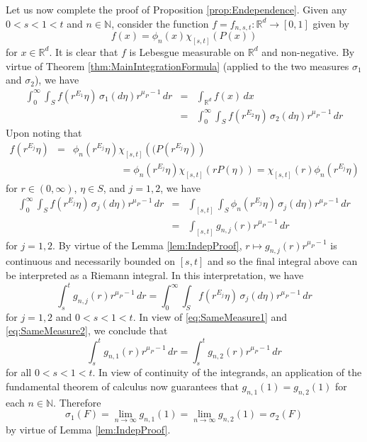 \documentclass[smallextended]{svjour3}
\theoremstyle{remark}
\renewenvironment{proof}[1][\proofname]{\renewcommand\xproofname{#1}\xproof}{\endxproof}
\begin{document}
\begin{proof}
\noindent Let us now complete the proof of Proposition \ref{prop:Endependence}. Given any $0<s<1< t$ and $n\in\mathbb{N}$, consider the function $f=f_{n,s,t}:\mathbb{R}^d\to [0,1]$ given by
\begin{equation*}
f(x)=\phi_n(x)\chi_{[s,t]}(P(x))
\end{equation*}
for $x\in\mathbb{R}^d$. It is clear that $f$ is Lebesgue measurable on $\mathbb{R}^d$ and non-negative. By virtue of Theorem \ref{thm:MainIntegrationFormula} (applied to the two measures $\sigma_1$ and $\sigma_2$), we have
\begin{eqnarray}\label{eq:SameMeasure1}
\int_0^\infty \int_Sf(r^{E_1}\eta)\,\sigma_1(d\eta)r^{\mu_P-1}\,dr
&=&\int_{\mathbb{R}^d}f(x)\,dx\nonumber\\
&=&\int_0^\infty \int_Sf(r^{E_2}\eta)\,\sigma_2(d\eta)r^{\mu_P-1}\,dr
\end{eqnarray}
Upon noting that
\begin{eqnarray*}
f(r^{E_j}\eta)&=&\phi_n(r^{E_j}\eta)\chi_{[s,t]}\left((P(r^{E_j}\eta)\right)\\
&& \hspace{2cm} =\phi_n(r^{E_j}\eta)\chi_{[s,t]}(rP(\eta))=\chi_{[s,t]}(r)\phi_n(r^{E_j}\eta)
\end{eqnarray*}
for $r\in (0,\infty)$, $\eta\in S$, and $j=1,2$, we have
\begin{eqnarray*}
\int_0^\infty\int_S f(r^{E_j}\eta)\,\sigma_j(d\eta)r^{\mu_P-1}\,dr&=&\int_{[s,t]}\int_S\phi_n(r^{E_j}\eta)\,\sigma_j(d\eta) r^{\mu_P-1}\,dr\\
&=&\int_{[s,t]}g_{n,j}(r)r^{\mu_P-1}\,dr
\end{eqnarray*}
for $j=1,2$. By virtue of the Lemma \ref{lem:IndepProof}, $r\mapsto g_{n,j}(r)r^{\mu_P-1}$ is continuous and necessarily bounded on $[s,t]$ and so the final integral above can be interpreted as a Riemann integral. In this interpretation, we have
\begin{equation}\label{eq:SameMeasure2}
\int_s^tg_{n,j}(r)r^{\mu_P-1}\,dr=\int_0^\infty \int_S f(r^{E_j}\eta)\,\sigma_j(d\eta)r^{\mu_P-1}\,dr
\end{equation}
for $j=1,2$ and $0<s<1<t$. In view of \eqref{eq:SameMeasure1} and \eqref{eq:SameMeasure2}, we conclude that
\begin{equation*}
\int_s^t g_{n,1}(r)r^{\mu_P-1}\,dr=\int_s^t g_{n,2}(r)r^{\mu_P-1}\,dr
\end{equation*}
for all $0<s<1<t$. In view of continuity of the integrands, an application of the fundamental theorem of calculus now guarantees that $g_{n,1}(1)=g_{n,2}(1)$ for each $n\in\mathbb{N}$. Therefore
\begin{equation*}
\sigma_1(F)=\lim_{n\to\infty}g_{n,1}(1)=\lim_{n\to\infty}g_{n,2}(1)=\sigma_2(F)
\end{equation*}
by virtue of Lemma \ref{lem:IndepProof}.
\end{proof}
\end{document}
